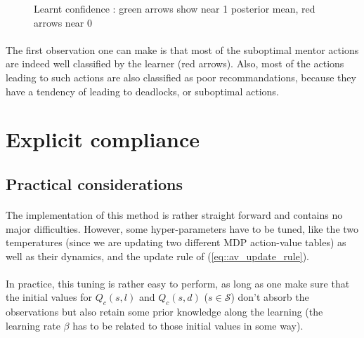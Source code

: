 \documentclass[a4paper]{report}
\begin{document}
{{{{\begin{figure}[ht!]
\begin{minipage}{0.5\linewidth}
\begin{center}
							\caption{Learnt confidence : green arrows show near 1 posterior mean, red arrows near 0}
							\label{fig::heatmap_confidence_50}
						\end{center}
					\end{minipage}
				\end{figure}
				
				\paragraph{} The first observation one can make is that most of the suboptimal mentor actions are indeed well classified by the learner (red arrows). Also, most of the actions leading to such actions are also classified as poor recommandations, because they have a tendency of leading to deadlocks, or suboptimal actions.  
			}
		}
		\section{Explicit compliance}
		{
		
			\subsection{Practical considerations}
			{
				\paragraph{} The implementation of this method is rather straight forward and contains no major difficulties. However, some hyper-parameters have to be tuned, like the two temperatures (since we are updating two different MDP action-value tables) as well as their dynamics, and the update rule of (\ref{eq::av_update_rule}). 
				
				\paragraph{} In practice, this tuning is rather easy to perform, as long as one make sure that the initial values for $Q_c(s,l)$ and $Q_c(s,d)$ ($s\in\mathcal{S}$) don't absorb the observations but also retain some prior knowledge along the learning (the learning rate $\beta$ has to be related to those initial values in some way). 
			}
}}}
\end{document}
